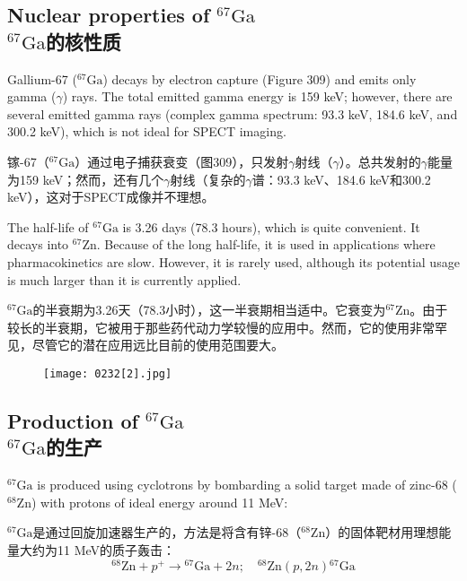 \documentclass[dvipsnames, svgnames,a4paper,11pt]{article}
\begin{document}
\subsection{Nuclear properties of \(\mathrm{^{67}Ga}\)\\ \(\mathrm{^{67}Ga}\)的核性质}  
Gallium-67 (\(\mathrm{^{67}Ga}\)) decays by electron capture (Figure 309) and emits only gamma (\(\gamma\)) rays. The total emitted gamma energy is 159 keV; however, there are several emitted gamma rays (complex gamma spectrum: 93.3 keV, 184.6 keV, and 300.2 keV), which is not ideal for SPECT imaging.

镓-67（\(\mathrm{^{67}Ga}\)）通过电子捕获衰变（图309），只发射$\gamma$射线（\(\gamma\)）。总共发射的$\gamma$能量为159 keV；然而，还有几个$\gamma$射线（复杂的$\gamma$谱：93.3 keV、184.6 keV和300.2 keV），这对于SPECT成像并不理想。

The half-life of \(\mathrm{^{67}Ga}\) is 3.26 days (78.3 hours), which is quite convenient. It decays into \(\mathrm{^{67}Zn}\). Because of the long half-life, it is used in applications where pharmacokinetics are slow. However, it is rarely used, although its potential usage is much larger than it is currently applied.

\(\mathrm{^{67}Ga}\)的半衰期为3.26天（78.3小时），这一半衰期相当适中。它衰变为\(\mathrm{^{67}Zn}\)。由于较长的半衰期，它被用于那些药代动力学较慢的应用中。然而，它的使用非常罕见，尽管它的潜在应用远比目前的使用范围要大。

\begin{figure}[h]
	\centering
    \texttt{[image: 0232[2].jpg]}  
     \label{fig309}
\end{figure}

\subsection{Production of \(\mathrm{^{67}Ga}\)\\ \(\mathrm{^{67}Ga}\)的生产}  
\(\mathrm{^{67}Ga}\) is produced using cyclotrons by bombarding a solid target made of zinc-68 (\(\mathrm{^{68}Zn}\)) with protons of ideal energy around 11 MeV:

\(\mathrm{^{67}Ga}\)是通过回旋加速器生产的，方法是将含有锌-68（\(\mathrm{^{68}Zn}\)）的固体靶材用理想能量大约为11 MeV的质子轰击：
\[
\mathrm{^{68}Zn} + p^{+} \rightarrow \mathrm{^{67}Ga} + 2n; \quad \mathrm{^{68}Zn}(p, 2n)\mathrm{^{67}Ga}
\]
\end{document}
